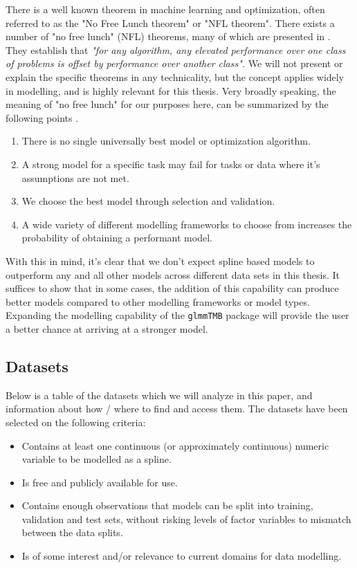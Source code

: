 \documentclass[12pt, twoside,hidelinks]{article}
\theoremstyle{definition}
\numberwithin{equation}{section}
\begin{document}
There is a well known theorem in machine learning and optimization, often referred to as the "No Free Lunch theorem" or "NFL theorem". There exists a number of "no free lunch" (NFL) theorems, many of which are presented in \citet{wolpert1997}. They establish that \textit{"for any algorithm, any elevated performance over one class of problems is offset by performance over another class".} We will not present or explain the specific theorems in any technicality, but the concept applies widely in modelling, and is highly relevant for this thesis. Very broadly speaking, the meaning of "no free lunch" for our purposes here, can be summarized by the following points \citep{Raschka2018}.

\begin{enumerate}
    \item There is no single universally best model or optimization algorithm.
    \item A strong model for a specific task may fail for tasks or data where it's assumptions are not met.
    \item We choose the best model through selection and validation.
    \item A wide variety of different modelling frameworks to choose from increases the probability of obtaining a performant model. 
\end{enumerate}

With this in mind, it's clear that we don't expect spline based models to outperform any and all other models across different data sets in this thesis. It suffices to show that in some cases, the addition of this capability can produce better models compared to other modelling frameworks or model types. Expanding the modelling capability of the \texttt{glmmTMB} package will provide the user a better chance at arriving at a stronger model.


\subsection{Datasets}\label{sec:analysis:datasets}

Below is a table of the datasets which we will analyze in this paper, and information about how / where to find and access them. The datasets have been selected on the following criteria: 

\begin{itemize}
    \item Contains at least one continuous (or approximately continuous) numeric variable to be modelled as a spline. \\
    \item Is free and publicly available for use.\\
    \item Contains enough observations that models can be split into training, validation and test sets, without risking levels of factor variables to mismatch between the data splits. \\
    \item Is of some interest and/or relevance to current domains for data modelling.
\end{itemize}
\end{document}
